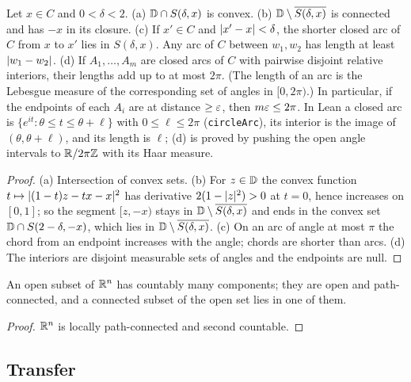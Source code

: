 \begin{lemma}\label{lem:disc-geometry}
Let $x\in C$ and $0<\delta<2$.
(a) $\mathbb{D}\cap S(\delta,x)$ is convex.
(b) $\mathbb{D}\setminus\overline{S(\delta,x)}$ is connected and has $-x$ in its closure.
(c) If $x'\in C$ and $\lvert x'-x\rvert<\delta$, the shorter closed arc of $C$ from $x$ to $x'$ lies in $S(\delta,x)$.
Any arc of $C$ between $w_1,w_2$ has length at least $\lvert w_1-w_2\rvert$.
(d) If $A_1,\dots,A_m$ are closed arcs of $C$ with pairwise disjoint relative interiors, their lengths add up to at most
$2\pi$. (The length of an arc is the Lebesgue measure of the corresponding set of angles in $[0,2\pi)$.) In particular,
if the endpoints of each $A_i$ are at distance $\ge\varepsilon$, then $m\varepsilon\le2\pi$.
In Lean a closed arc is $\{e^{it}:\theta\le t\le\theta+\ell\}$ with $0\le\ell\le2\pi$ (\texttt{circleArc}), its interior
is the image of $(\theta,\theta+\ell)$, and its length is $\ell$; (d) is proved by pushing the open angle intervals to
$\mathbb{R}/2\pi\mathbb{Z}$ with its Haar measure.
\end{lemma}
\begin{proof}
(a) Intersection of convex sets. (b) For $z\in\mathbb{D}$ the convex function $t\mapsto\lvert (1-t)z-tx-x\rvert^2$ has
derivative $2(1-\lvert z\rvert^2)>0$ at $t=0$, hence increases on $[0,1]$; so the segment $[z,-x)$ stays in
$\mathbb{D}\setminus\overline{S(\delta,x)}$ and ends in the convex set $\mathbb{D}\cap S(2-\delta,-x)$, which lies in
$\mathbb{D}\setminus\overline{S(\delta,x)}$. (c) On an arc of angle at most $\pi$ the chord from an endpoint
increases with the angle; chords are shorter than arcs. (d) The interiors are disjoint measurable sets of
angles and the endpoints are null.
\end{proof}

\begin{lemma}\label{lem:open-components}
An open subset of $\mathbb{R}^n$ has countably many components; they are open and path-connected, and a
connected subset of the open set lies in one of them.
\end{lemma}
\begin{proof}
$\mathbb{R}^n$ is locally path-connected and second countable.
\end{proof}

\subsection{Transfer}

